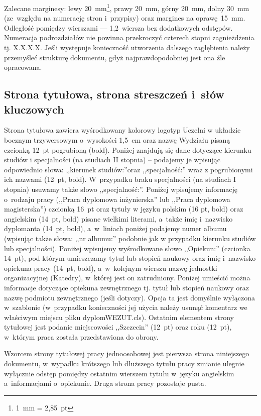 \documentclass[skorowidz,skroty]{dyplomWEZUT}
\begin{document}
Zalecane marginesy: lewy 20~mm\footnote{1~mm = 2,85~pt}, prawy 20~mm, górny 20~mm, dolny 30~mm (ze~względu na numerację stron i~przypisy) oraz margines na oprawę~15~mm. Odległość pomiędzy wierszami --- 1,2~wiersza bez dodatkowych odstępów. Numeracja podrozdziałów nie powinna przekroczyć czterech stopni zagnieżdżenia tj. X.X.X.X. Jeśli występuje konieczność utworzenia dalszego zagłębienia należy przemyśleć strukturę dokumentu, gdyż najprawdopodobniej jest ona źle opracowana.

\subsection{Strona tytułowa, strona streszczeń i~słów kluczowych}

Strona tytułowa zawiera wyśrodkowany kolorowy logotyp Uczelni w układzie bocznym trzywersowym o~wysokości 1,5~cm oraz nazwę Wydziału pisaną czcionką 12~pt pogrubioną (bold). Poniżej znajdują się dane dotyczące kierunku studiów i specjalności (na studiach II stopnia) -- podajemy je wpisując odpowiednio słowa: ,,kierunek studiów:''oraz ,,specjalność:'' wraz z pogrubionymi ich nazwami (12~pt, bold). W~przypadku braku specjalności (na studiach I stopnia) usuwamy także słowo ,,specjalność:''.
Poniżej wpisujemy informację o~rodzaju pracy (,,Praca dyplomowa inżynierska'' lub ,,Praca dyplomowa magisterska'') czcionką 16~pt oraz tytuły w języku polskim (16 pt, bold) oraz angielskim (14~pt, bold) pisane wielkimi literami, a~także imię i~nazwisko dyplomanta (14~pt, bold), a~w~liniach poniżej podajemy numer albumu (wpisując także słowa: ,,nr albumu:'' podobnie jak w przypadku kierunku studiów lub specjalności).
Poniżej wpisujemy wyśrodkowane słowo ,,Opiekun:'' (czcionka 14~pt), pod którym umieszczamy tytuł lub stopień naukowy oraz imię i~nazwisko opiekuna pracy (14~pt, bold), a~w~kolejnym wierszu nazwę jednostki organizacyjnej (Katedry), w~której jest on zatrudniony.
Poniżej umieścić można informacje dotyczące opiekuna zewnętrznego tj. tytuł lub stopień naukowy oraz nazwę podmiotu zewnętrznego (jeśli dotyczy). Opcja ta jest domyślnie wyłączona w~szablonie (w~przypadku konieczności jej użycia należy usunąć komentarz we właściwym miejscu pliku dyplomWEZUT.cls). Ostatnim elementem strony tytułowej jest podanie miejscowości ,,Szczecin'' (12~pt) oraz roku (12~pt), w~którym praca została przedstawiona do obrony.

Wzorcem strony tytułowej pracy jednoosobowej jest pierwsza strona niniejszego dokumentu, w~wypadku krótszego lub dłuższego tytułu pracy zmianie ulegnie wyłącznie odstęp pomiędzy ostatnim wierszem tytułu w~języku angielskim a~informacjami o~opiekunie. Druga strona pracy pozostaje pusta.
\end{document}
